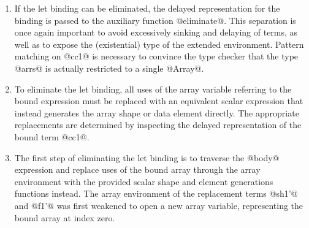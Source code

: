 \begin{enumerate}
    If the let binding will not be eliminated, it is added to the extended
    environment, indicating that it is to be evaluated to a manifest term. Note
    that it is important to add the term to a \emph{new} environment. Otherwise,
    nested let bindings are effectively flattened, resulting in terms required
    for the bound term being lifted out into the same scope as the body. That
    is, if we don't place the binding into a fresh environment, we get terms
    such as:
\begin{lstlisting}[style=haskell]
let a0  = %$\langle$ terms for binding $\rangle$% in
let bnd = %$\langle$ bound term $\rangle$% in
%$\langle$ body term $\rangle$%
\end{lstlisting}
    Rather than the following, where the scope of @a0@ is restricted to the
    evaluation of the bound term only:
\begin{lstlisting}[style=haskell]
let bnd =
  let a0 = %$\langle$ terms for binding $\rangle$%
  in %$\langle$ bound term $\rangle$%
in %$\langle$ body term $\rangle$%
\end{lstlisting}
    Removing the nested structure of let bindings increases the scope of bound
    terms, and hence has the side effect of increasing the maximum memory usage.

\item If the let binding can be eliminated, the delayed representation for the
    binding is passed to the auxiliary function @eliminate@. This separation is
    once again important to avoid excessively sinking and delaying of terms, as
    well as to expose the (existential) type of the extended environment.
    Pattern matching on @cc1@ is necessary to convince the type checker that the
    type @arrs@ is actually restricted to a single @Array@.

\item To eliminate the let binding, all uses of the array variable referring to
    the bound expression must be replaced with an equivalent scalar expression
    that instead generates the array shape or data element directly. The
    appropriate replacements are determined by inspecting the delayed
    representation of the bound term @cc1@.

\item The first step of eliminating the let binding is to traverse the @body@
    expression and replace uses of the bound array through the array environment
    with the provided scalar shape and element generations functions instead.
    The array environment of the replacement terms @sh1'@ and @f1'@ was first
    weakened to open a new array variable, representing the bound array at index
    zero.


\end{enumerate}
